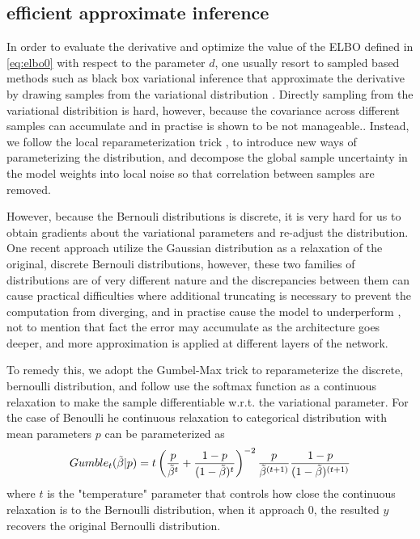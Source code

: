 \subsection{efficient approximate inference}\label{sec:approximate-inference}


In order to evaluate the derivative and optimize the value of the ELBO defined in \autoref{eq:elbo0} with respect to the parameter $d$, 
one usually resort to sampled based methods such as black box variational inference that approximate the derivative by drawing samples from the variational distribution \cite{ranganath2014black}. 
Directly sampling from the variational distribition is hard, however, because the covariance across different samples can accumulate and in practise is shown to be  not manageable.\cite{gal2017concrete}.
Instead, we follow the local reparameterization trick \citep{Kingma2015},
to introduce new ways of parameterizing the distribution, and 
decompose the global sample uncertainty in the model weights into local noise 
so that correlation between samples are removed.

However, because the Bernouli distributions is discrete, it is very hard for us to obtain gradients about the variational parameters and re-adjust the distribution. One recent approach  \cite{chen2019large} utilize the Gaussian distribution as a relaxation of the original, discrete 
Bernouli distributions, however, these two families of distributions are of very different nature and the discrepancies between them can cause practical difficulties where additional truncating is necessary to prevent the computation from diverging, and in practise cause the model to underperform
\cite{molchanov2016dropout}, 
not to mention that fact the error may accumulate as the architecture goes deeper, and more approximation is applied at different layers of the network.

To remedy this, we adopt the Gumbel-Max trick \cite{gumbel1954statistical, gummaddison2014sampling} to reparameterize the discrete, bernoulli distribution,
and follow \cite{jang2016categorical} use the softmax function as a continuous relaxation to make the sample differentiable w.r.t. the variational parameter. 
For the case of Benoulli he continuous relaxation to categorical distribution with mean parameters $p$ can be parameterized as 
\begin{equation}
Gumble_{t}( \tilde{\beta} | p) = t \left( \frac{p}{\tilde{\beta}^t} + \frac{1 - p}{(1- \tilde{\beta})^t} \right)^{-2} 
\frac{p}{\tilde{\beta}^{(t + 1)}} \frac{1 - p}{(1 - \tilde{\beta})^{(t + 1)}}  
\\
\end{equation}
where $t$ is the "temperature" parameter that controls how close the continuous relaxation is to the Bernoulli distribution, when it approach 0, the resulted $y$ recovers the original Bernoulli distribution.

